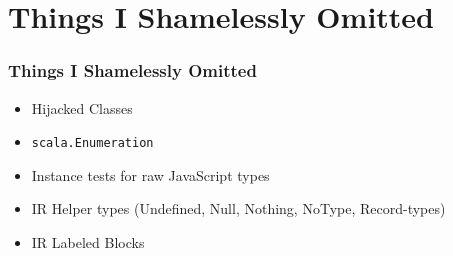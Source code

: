\documentclass{beamer}
\begin{document}
\begin{frame}
\end{frame}

\section*{Things I Shamelessly Omitted}

\begin{frame}
  \frametitle{Things I Shamelessly Omitted}

  \begin{itemize}
  \item Hijacked Classes
  \item \texttt{scala.Enumeration}
  \item Instance tests for raw JavaScript types
  \item IR Helper types (Undefined, Null, Nothing, NoType, Record-types)
  \item IR Labeled Blocks
  \end{itemize}
\end{frame}
\end{document}
